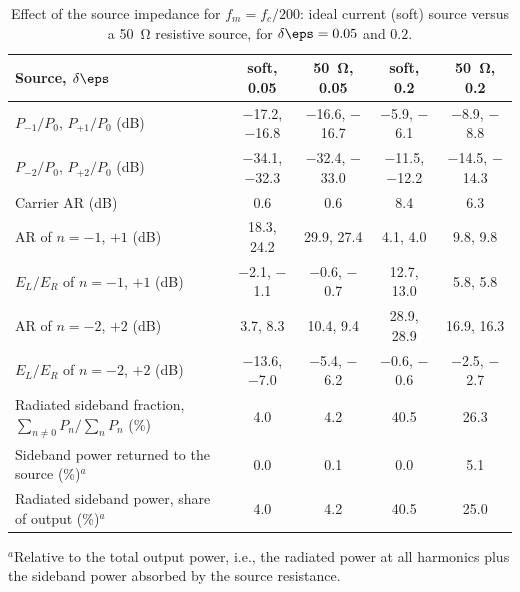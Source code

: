 \begin{table}[t]
\centering
\caption{Effect of the source impedance for $f_m=f_c/200$: ideal current (soft) source versus a \SI{50}{\ohm} resistive source, for $\delta\eps=0.05$ and $0.2$.}
\label{tab:source}
\footnotesize
\setlength{\tabcolsep}{3pt}
\begin{tabular}{@{}lcccc@{}}
\toprule
Source, $\delta\eps$ & soft, 0.05 & \SI{50}{\ohm}, 0.05 & soft, 0.2 & \SI{50}{\ohm}, 0.2 \\
\midrule
$P_{-1}/P_0$, $P_{+1}/P_0$ (dB) & $-$17.2, $-$16.8 & $-$16.6, $-$16.7 & $-$5.9, $-$6.1 & $-$8.9, $-$8.8 \\
$P_{-2}/P_0$, $P_{+2}/P_0$ (dB) & $-$34.1, $-$32.3 & $-$32.4, $-$33.0 & $-$11.5, $-$12.2 & $-$14.5, $-$14.3 \\
Carrier AR (dB) & 0.6 & 0.6 & 8.4 & 6.3 \\
AR of $n=-1$, $+1$ (dB) & 18.3, 24.2 & 29.9, 27.4 & 4.1, 4.0 & 9.8, 9.8 \\
$E_L/E_R$ of $n=-1$, $+1$ (dB) & $-$2.1, $-$1.1 & $-$0.6, $-$0.7 & 12.7, 13.0 & 5.8, 5.8 \\
AR of $n=-2$, $+2$ (dB) & 3.7, 8.3 & 10.4, 9.4 & 28.9, 28.9 & 16.9, 16.3 \\
$E_L/E_R$ of $n=-2$, $+2$ (dB) & $-$13.6, $-$7.0 & $-$5.4, $-$6.2 & $-$0.6, $-$0.6 & $-$2.5, $-$2.7 \\
Radiated sideband fraction, $\sum_{n\neq0}P_n/\sum_nP_n$ (\%) & 4.0 & 4.2 & 40.5 & 26.3 \\
Sideband power returned to the source (\%)$^{a}$ & 0.0 & 0.1 & 0.0 & 5.1 \\
Radiated sideband power, share of output (\%)$^{a}$ & 4.0 & 4.2 & 40.5 & 25.0 \\
\bottomrule
\end{tabular}

\smallskip
\footnotesize $^{a}$Relative to the total output power, i.e., the radiated power at all harmonics plus the sideband power absorbed by the source resistance.
\end{table}
